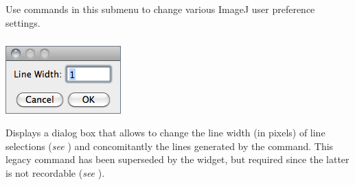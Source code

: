 \subsection{\protect{}\label{sub:Options}}

Use commands in this submenu to change various ImageJ user preference
settings. 


\subsubsection{\protect{}\label{sub:Line-Width...}}

\begin{minipage}[c][1\totalheight][t]{0.26\columnwidth}%
\includegraphics[scale=0.55]{images/LineWidth1}%
\end{minipage}%
\begin{minipage}[c][1\totalheight][t]{0.74\columnwidth}%
Displays a dialog box that allows to change the line width (in pixels)
of line selections (\emph{see} )
and concomitantly the lines generated by the 
command. This legacy command has been superseded by the 
widget, but required since the latter is not recordable (\emph{see}
).%
\end{minipage}


\subsubsection[\protect\userinterface{Input/Output\ldots{}}]{\protect{}\label{sub:Input/Output...}\improvement{}}

